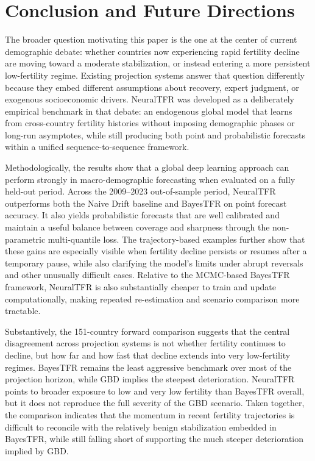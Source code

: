 \documentclass[12pt]{article}
\begin{document}
\section{Conclusion and Future Directions}

The broader question motivating this paper is the one at the center of current demographic debate: whether countries now experiencing rapid fertility decline are moving toward a moderate stabilization, or instead entering a more persistent low-fertility regime. Existing projection systems answer that question differently because they embed different assumptions about recovery, expert judgment, or exogenous socioeconomic drivers. NeuralTFR was developed as a deliberately empirical benchmark in that debate: an endogenous global model that learns from cross-country fertility histories without imposing demographic phases or long-run asymptotes, while still producing both point and probabilistic forecasts within a unified sequence-to-sequence framework.

Methodologically, the results show that a global deep learning approach can perform strongly in macro-demographic forecasting when evaluated on a fully held-out period. Across the 2009--2023 out-of-sample period, NeuralTFR outperforms both the Naive Drift baseline and BayesTFR on point forecast accuracy. It also yields probabilistic forecasts that are well calibrated and maintain a useful balance between coverage and sharpness through the non-parametric multi-quantile loss. The trajectory-based examples further show that these gains are especially visible when fertility decline persists or resumes after a temporary pause, while also clarifying the model's limits under abrupt reversals and other unusually difficult cases. Relative to the MCMC-based BayesTFR framework, NeuralTFR is also substantially cheaper to train and update computationally, making repeated re-estimation and scenario comparison more tractable.

Substantively, the 151-country forward comparison suggests that the central disagreement across projection systems is not whether fertility continues to decline, but how far and how fast that decline extends into very low-fertility regimes. BayesTFR remains the least aggressive benchmark over most of the projection horizon, while GBD implies the steepest deterioration. NeuralTFR points to broader exposure to low and very low fertility than BayesTFR overall, but it does not reproduce the full severity of the GBD scenario. Taken together, the comparison indicates that the momentum in recent fertility trajectories is difficult to reconcile with the relatively benign stabilization embedded in BayesTFR, while still falling short of supporting the much steeper deterioration implied by GBD.
\end{document}
